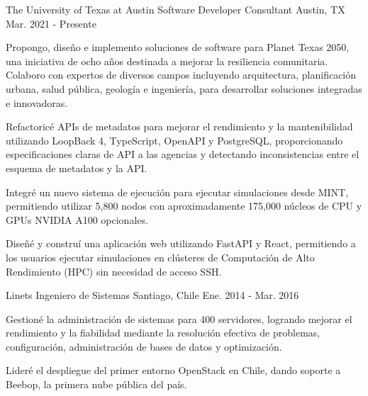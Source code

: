 \begin{cventries}
  \cventry
    {The University of Texas at Austin}
    {Software Developer Consultant}
    {Austin, TX}
    {Mar. 2021 - Presente}
    {
      \begin{cvitems}
        \item{Propongo, diseño e implemento soluciones de software para Planet Texas 2050, una iniciativa de ocho años destinada a mejorar la resiliencia comunitaria. Colaboro con expertos de diversos campos incluyendo arquitectura, planificación urbana, salud pública, geología e ingeniería, para desarrollar soluciones integradas e innovadoras.}
        \item{Refactoricé APIs de metadatos para mejorar el rendimiento y la mantenibilidad utilizando LoopBack 4, TypeScript, OpenAPI y PostgreSQL, proporcionando especificaciones claras de API a las agencias y detectando inconsistencias entre el esquema de metadatos y la API.}
        \item{Integré un nuevo sistema de ejecución para ejecutar simulaciones desde MINT, permitiendo utilizar 5,800 nodos con aproximadamente 175,000 núcleos de CPU y GPUs NVIDIA A100 opcionales.}
        \item{Diseñé y construí una aplicación web utilizando FastAPI y React, permitiendo a los usuarios ejecutar simulaciones en clústeres de Computación de Alto Rendimiento (HPC) sin necesidad de acceso SSH.}
      \end{cvitems}
    }

  \cventry
    {Linets}
    {Ingeniero de Sistemas}
    {Santiago, Chile}
    {Ene. 2014 - Mar. 2016}
    {
      \begin{cvitems}
        \item{Gestioné la administración de sistemas para 400 servidores, logrando mejorar el rendimiento y la fiabilidad mediante la resolución efectiva de problemas, configuración, administración de bases de datos y optimización.}
        \item{Lideré el despliegue del primer entorno OpenStack en Chile, dando soporte a Beebop, la primera nube pública del país.}
      \end{cvitems}
    }

\end{cventries}
